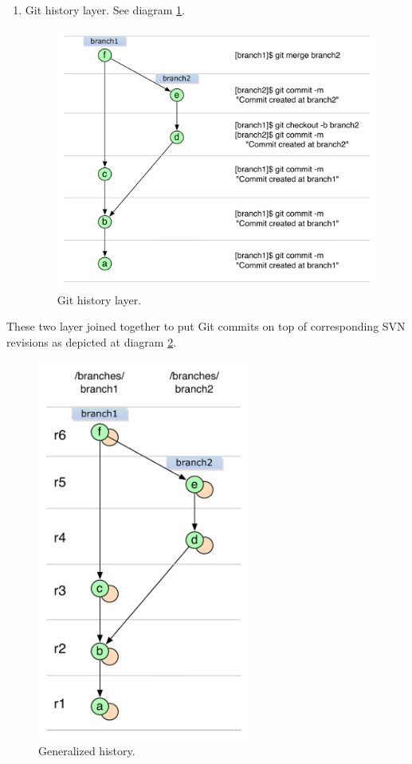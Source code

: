 \begin{enumerate}
	\newpage
	\item Git history layer. See diagram \ref{git_layer}.
	\begin{figure}[!h]
	\label{git_layer}
	\centering
	\includegraphics[width=\linewidth]{img/legend/git_layer.pdf}
	\caption{Git history layer.}
	\end{figure}
\end{enumerate}

\newpage
These two layer joined together to put Git commits on top of corresponding SVN revisions as depicted at diagram \ref{both_layers}.
\begin{figure}[!h]
\label{both_layers}
\centering
\includegraphics[width=7.0cm]{img/legend/generalized_history.pdf}
\caption{Generalized history.}
\end{figure}